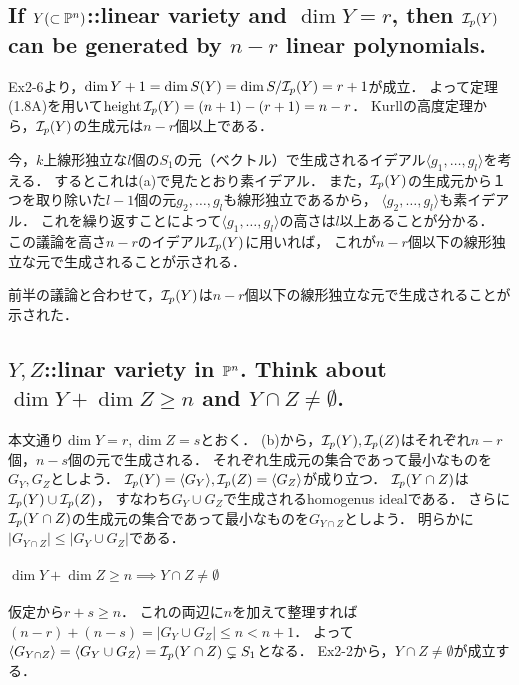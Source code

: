 \documentclass[a4paper]{jsarticle}
\begin{document}
    \subsection{If $Y(\subset \mathbb{P}^n)$::linear variety and $\dim Y=r$, then $\mathcal{I}_p(Y)$ can be generated by $n-r$ linear polynomials.}
    Ex2-6より，$\dim Y+1=\dim S(Y)=\dim S/\mathcal{I}_p(Y)=r+1$が成立．
    よって定理(1.8A)を用いて$\operatorname{height} \mathcal{I}_p(Y)=(n+1)-(r+1)=n-r$．
    Kurllの高度定理から，$\mathcal{I}_p(Y)$の生成元は$n-r$個以上である．

    今，$k$上線形独立な$l$個の$S_1$の元（ベクトル）で生成されるイデアル$\langle g_1, \dots, g_l \rangle$を考える．
    するとこれは(a)で見たとおり素イデアル．
    また，$\mathcal{I}_p(Y)$の生成元から１つを取り除いた$l-1$個の元$g_2, \dots, g_l$も線形独立であるから，
    $\langle g_2, \dots, g_l \rangle$も素イデアル．
    これを繰り返すことによって$\langle g_1, \dots, g_l \rangle$の高さは$l$以上あることが分かる．
    この議論を高さ$n-r$のイデアル$\mathcal{I}_p(Y)$に用いれば，
    これが$n-r$個以下の線形独立な元で生成されることが示される．

    前半の議論と合わせて，$\mathcal{I}_p(Y)$は$n-r$個以下の線形独立な元で生成されることが示された．

    \subsection{$Y, Z$::linar variety in $\mathbb{P}^n$. Think about $\dim Y+\dim Z \geq n$ and $Y \cap Z \neq \emptyset$.}
    本文通り$\dim Y=r, \dim Z=s$とおく．
    (b)から，$\mathcal{I}_p(Y), \mathcal{I}_p(Z)$はそれぞれ$n-r$個，$n-s$個の元で生成される．
    それぞれ生成元の集合であって最小なものを$G_Y, G_Z$としよう．
    $\mathcal{I}_p(Y)=\langle G_Y \rangle, \mathcal{I}_p(Z)=\langle G_Z \rangle$が成り立つ．
    $\mathcal{I}_p(Y \cap Z)$は$\mathcal{I}_p(Y) \cup \mathcal{I}_p(Z)$，
    すなわち$G_Y \cup G_Z$で生成されるhomogenus idealである．
    さらに$\mathcal{I}_p(Y \cap Z)$の生成元の集合であって最小なものを$G_{Y \cap Z}$としよう．
    明らかに$|G_{Y \cap Z}| \leq |G_Y \cup G_Z|$である．

    \paragraph{$\dim Y+\dim Z \geq n \implies Y \cap Z \neq \emptyset$}
    仮定から$r+s \geq n$．
    これの両辺に$n$を加えて整理すれば$(n-r)+(n-s)=|G_Y \cup G_Z| \leq n < n+1$．
    よって$\langle G_{Y \cap Z} \rangle=\langle G_Y \cup G_Z \rangle=\mathcal{I}_p(Y \cap Z) \subsetneq S_1$となる．
    Ex2-2から，$Y \cap Z \neq \emptyset$が成立する．
\end{document}
